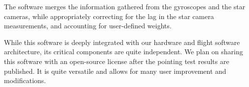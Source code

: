The software merges the information gathered from the gyroscopes and the star cameras, while appropriately correcting for the lag in the star camera measurements, and accounting for user-defined weights. 

While this software is deeply integrated with our hardware and flight software architecture, its critical components are quite independent. We plan on sharing this software with an open-source license after the pointing test results are published. It is quite versatile and allows for many user improvement and modifications.